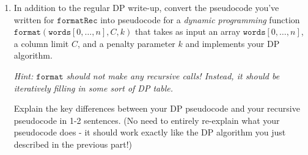 \documentclass[12 pt, letterpaper]{hmcpset}
\begin{document}
\begin{problem}
\begin{enumerate}
    Some details:
    \begin{itemize}
        \item Every character (including spaces) takes up one column.
        \item Every character that isn't a space is part of a word. The first three words in the given example are \texttt{"Call"}, \texttt{"me"}, and \texttt{"Ishmael."}
        \item Separate each pair of words by one space. You don't need to include an extra space at the beginning or end of a line.
        \item Don't worry about ``compiling'' your pseudocode: your write-up should make clear what recursive calls are being made and how words are being stored into lines of width at most $C$, but the result doesn't need to closely track the syntax of any programming language.
    \end{itemize}
    
\item In addition to the regular DP write-up, convert the pseudocode you've written for $\mathtt{formatRec}$ into pseudocode for a \emph{dynamic programming} function $\mathtt{format}(\mathtt{words}[0, \dots, n], C, k)$ that takes as input an array $\mathtt{words}[0, \dots, n]$, a column limit $C$, and a penalty parameter ${k}$ and implements your DP algorithm.
    
    \emph{Hint: $\mathtt{format}$ should not make any recursive calls! Instead, it should be iteratively filling in some sort of DP table.} 

    Explain the key differences between your DP pseudocode and your recursive pseudocode in 1-2 sentences. (No need to entirely re-explain what your pseudocode does - it should work exactly like the DP algorithm you just described in the previous part!)
\end{enumerate}
\end{problem}
\end{document}
